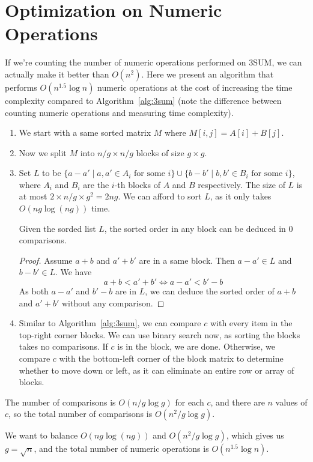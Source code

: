 \section{Optimization on Numeric Operations}

If we're counting the number of numeric operations performed on 3SUM, we can actually make it better than $O(n^2)$. Here we present an algorithm that performs $O(n^{1.5}\log n)$ numeric operations at the cost of increasing the time complexity compared to Algorithm~\ref{alg:3sum} (note the difference between counting numeric operations and measuring time complexity).

\begin{enumerate}
	\item We start with a same sorted matrix $M$ where $M[i, j] = A[i] + B[j]$.
	\item Now we split $M$ into $n/g \times n/g$ blocks of size $g \times g$.
	\item Set $L$ to be $\{a-a' \mid a,a'\in A_i \text{ for some } i\} \cup \{b-b' \mid b,b'\in B_i \text{ for some } i\}$, where $A_i$ and $B_i$ are the $i$-th blocks of $A$ and $B$ respectively. The size of $L$ is at most $2\times n/g \times g^2 = 2ng$.
	      We can afford to sort $L$, as it only takes $O(ng \log (ng))$ time.
	      \begin{lemma}
		      Given the sorded list $L$, the sorted order in any block can be deduced in 0 comparisons.
	      \end{lemma}
	      \begin{proof}
		      Assume $a+b$ and $a'+b'$ are in a same block. Then $a-a' \in L$ and $b-b' \in L$. We have
		      \[
			      a+b < a'+b' \iff a-a' < b'-b
		      \]
		      As both $a-a'$ and $b'-b$ are in $L$, we can deduce the sorted order of $a+b$ and $a'+b'$ without any comparison.
	      \end{proof}
	\item Similar to Algorithm~\ref{alg:3sum}, we can compare $c$ with every item in the top-right corner blocks. We can use binary search now, as sorting the blocks takes no comparisons.
	      If $c$ is in the block, we are done. Otherwise, we compare $c$ with the bottom-left corner of the block matrix to determine whether to move down or left, as it can eliminate an entire row or array of blocks.
\end{enumerate}
The number of comparisons is $O(n/g \log g)$ for each $c$, and there are $n$ values of $c$, so the total number of comparisons is $O(n^2/g \log g)$.

We want to balance $O(ng \log (ng))$ and $O(n^2/g \log g)$, which gives us $g = \sqrt{n}$, and the total number of numeric operations is $O(n^{1.5} \log n)$.
